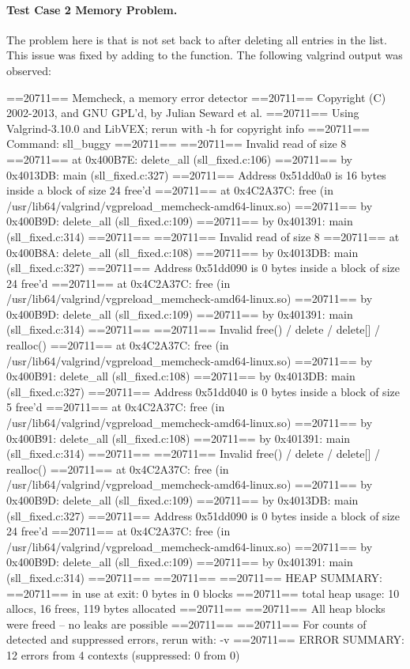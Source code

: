 \documentclass[12pt]{article}
\begin{document}
\paragraph{Test Case 2 Memory Problem.} The problem here is that \rmfamily{} is not set back to \rmfamily{} after deleting all entries in the list. This issue was fixed by adding \rmfamily{} to the \rmfamily{} function. The following valgrind output was observed:
\begin{verbnobox}[\scriptsize]
==20711== Memcheck, a memory error detector
==20711== Copyright (C) 2002-2013, and GNU GPL'd, by Julian Seward et al.
==20711== Using Valgrind-3.10.0 and LibVEX; rerun with -h for copyright info
==20711== Command: sll_buggy
==20711==
==20711== Invalid read of size 8
==20711==    at 0x400B7E: delete_all (sll_fixed.c:106)
==20711==    by 0x4013DB: main (sll_fixed.c:327)
==20711==  Address 0x51dd0a0 is 16 bytes inside a block of size 24 free'd
==20711==    at 0x4C2A37C: free (in /usr/lib64/valgrind/vgpreload_memcheck-amd64-linux.so)
==20711==    by 0x400B9D: delete_all (sll_fixed.c:109)
==20711==    by 0x401391: main (sll_fixed.c:314)
==20711==
==20711== Invalid read of size 8
==20711==    at 0x400B8A: delete_all (sll_fixed.c:108)
==20711==    by 0x4013DB: main (sll_fixed.c:327)
==20711==  Address 0x51dd090 is 0 bytes inside a block of size 24 free'd
==20711==    at 0x4C2A37C: free (in /usr/lib64/valgrind/vgpreload_memcheck-amd64-linux.so)
==20711==    by 0x400B9D: delete_all (sll_fixed.c:109)
==20711==    by 0x401391: main (sll_fixed.c:314)
==20711==
==20711== Invalid free() / delete / delete[] / realloc()
==20711==    at 0x4C2A37C: free (in /usr/lib64/valgrind/vgpreload_memcheck-amd64-linux.so)
==20711==    by 0x400B91: delete_all (sll_fixed.c:108)
==20711==    by 0x4013DB: main (sll_fixed.c:327)
==20711==  Address 0x51dd040 is 0 bytes inside a block of size 5 free'd
==20711==    at 0x4C2A37C: free (in /usr/lib64/valgrind/vgpreload_memcheck-amd64-linux.so)
==20711==    by 0x400B91: delete_all (sll_fixed.c:108)
==20711==    by 0x401391: main (sll_fixed.c:314)
==20711==
==20711== Invalid free() / delete / delete[] / realloc()
==20711==    at 0x4C2A37C: free (in /usr/lib64/valgrind/vgpreload_memcheck-amd64-linux.so)
==20711==    by 0x400B9D: delete_all (sll_fixed.c:109)
==20711==    by 0x4013DB: main (sll_fixed.c:327)
==20711==  Address 0x51dd090 is 0 bytes inside a block of size 24 free'd
==20711==    at 0x4C2A37C: free (in /usr/lib64/valgrind/vgpreload_memcheck-amd64-linux.so)
==20711==    by 0x400B9D: delete_all (sll_fixed.c:109)
==20711==    by 0x401391: main (sll_fixed.c:314)
==20711==
==20711==
==20711== HEAP SUMMARY:
==20711==     in use at exit: 0 bytes in 0 blocks
==20711==   total heap usage: 10 allocs, 16 frees, 119 bytes allocated
==20711==
==20711== All heap blocks were freed -- no leaks are possible
==20711==
==20711== For counts of detected and suppressed errors, rerun with: -v
==20711== ERROR SUMMARY: 12 errors from 4 contexts (suppressed: 0 from 0)
\end{verbnobox}
\end{document}
